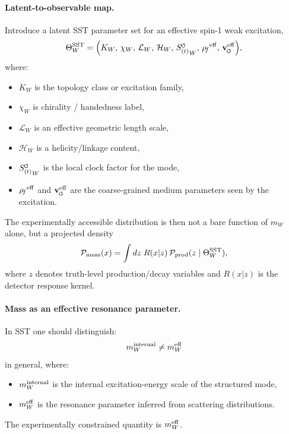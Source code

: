 \documentclass[11pt]{article}
\theoremstyle{definition}
\theoremstyle{plain}
\theoremstyle{remark}
\newcommand{\swirlarrow}{\mathchoice{\mkern-2mu\scriptstyle\boldsymbol{\circlearrowleft}}{\mkern-2mu\scriptstyle\boldsymbol{\circlearrowleft}}{\mkern-2mu\scriptscriptstyle\boldsymbol{\circlearrowleft}}{\mkern-2mu\scriptscriptstyle\boldsymbol{\circlearrowleft}}}
\newcommand{\vswirl}{\mathbf{v}_{\swirlarrow}}
\newcommand{\rhoF}{{\rho_{\!f}}}
\newcommand{\SwirlClock}{{S_{(t)}^{\swirlarrow}}}
\begin{document}
        \paragraph{Latent-to-observable map.}
            Introduce a latent SST parameter set for an effective spin-1 weak excitation,
            \begin{equation}
                \Theta_{W}^{\rm SST}
                =
                \Bigl(
                K_W,\,
                \chi_W,\,
                \mathcal{L}_W,\,
                \mathcal{H}_W,\,
                \SwirlClock_W,\,
                \rhoF^{\rm eff},\,
                \vswirl^{\rm eff}
                \Bigr),
            \end{equation}
            where:
            \begin{itemize}
                \item $K_W$ is the topology class or excitation family,
                \item $\chi_W$ is chirality / handedness label,
                \item $\mathcal{L}_W$ is an effective geometric length scale,
                \item $\mathcal{H}_W$ is a helicity/linkage content,
                \item $\SwirlClock_W$ is the local clock factor for the mode,
                \item $\rhoF^{\rm eff}$ and $\vswirl^{\rm eff}$ are the coarse-grained medium parameters seen by the excitation.
            \end{itemize}
            
            The experimentally accessible distribution is then not a bare function of $m_W$ alone, but a projected density
            \begin{equation}
                \mathcal{P}_{\rm meas}(x)
                =
                \int dz\; R(x|z)\,\mathcal{P}_{\rm prod}(z\mid \Theta_W^{\rm SST}),
                \label{eq:sst-forward-map}
            \end{equation}
            where $z$ denotes truth-level production/decay variables and $R(x|z)$ is the detector response kernel.
    
        \paragraph{Mass as an effective resonance parameter.}
            In SST one should distinguish:
            \begin{equation}
                m_W^{\rm internal}
                \neq
                m_W^{\rm eff}
            \end{equation}
            in general, where:
            \begin{itemize}
                \item $m_W^{\rm internal}$ is the internal excitation-energy scale of the structured mode,
                \item $m_W^{\rm eff}$ is the resonance parameter inferred from scattering distributions.
            \end{itemize}
            The experimentally constrained quantity is $m_W^{\rm eff}$.
            
\end{document}
